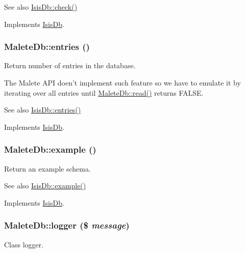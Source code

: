 \begin{DoxySeeAlso}{See also}
\hyperlink{interfaceIsisDb_af681b8f990b579f1835aa7ba4c83f1b8}{IsisDb::check()} 
\end{DoxySeeAlso}


Implements \hyperlink{interfaceIsisDb_af681b8f990b579f1835aa7ba4c83f1b8}{IsisDb}.

\hypertarget{classMaleteDb_a5c6cb09a072e5d2ddce31c77098ccba4}{
\subsubsection[{entries}]{\setlength{\rightskip}{0pt plus 5cm}MaleteDb::entries ()}}
\label{classMaleteDb_a5c6cb09a072e5d2ddce31c77098ccba4}
Return number of entries in the database.

The Malete API doen't implement such feature so we have to emulate it by iterating over all entries until \hyperlink{classMaleteDb_ad2a65876db24adc388afce465e0c153e}{MaleteDb::read()} returns FALSE.

\begin{DoxySeeAlso}{See also}
\hyperlink{interfaceIsisDb_a86f38eca2b6d0835b60770d8a4e511ff}{IsisDb::entries()} 
\end{DoxySeeAlso}


Implements \hyperlink{interfaceIsisDb_a86f38eca2b6d0835b60770d8a4e511ff}{IsisDb}.

\hypertarget{classMaleteDb_a4f16c48facae498d0db1a042e9727d04}{
\subsubsection[{example}]{\setlength{\rightskip}{0pt plus 5cm}MaleteDb::example ()}}
\label{classMaleteDb_a4f16c48facae498d0db1a042e9727d04}
Return an example schema.

\begin{DoxySeeAlso}{See also}
\hyperlink{interfaceIsisDb_a857c10d90da64067efa17afb2f32edb6}{IsisDb::example()} 
\end{DoxySeeAlso}


Implements \hyperlink{interfaceIsisDb_a857c10d90da64067efa17afb2f32edb6}{IsisDb}.

\hypertarget{classMaleteDb_a17562c1c53594762454d65be823fcdb5}{
\subsubsection[{logger}]{\setlength{\rightskip}{0pt plus 5cm}MaleteDb::logger (\$ {\em message})}}
\label{classMaleteDb_a17562c1c53594762454d65be823fcdb5}
Class logger.


